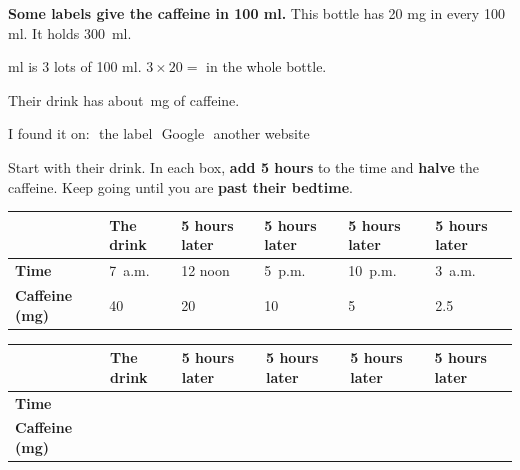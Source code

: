 \documentclass[12pt,a4paper]{article}
\newcommand{\tall}{\rule[-0.9em]{0pt}{2.6em}}
\newcommand{\hrow}{\rowcolor{cbteal!10}}
\newcommand{\starter}[1]{{\leavevmode\color{black!60}#1}}
\newcommand{\mg}[1][1.8cm]{\blank[#1]\,mg}
\newcommand{\choice}[1]{\tickbox\,\,#1}
\newcommand{\halvehead}{%
  \hline
  \hrow & \textbf{The drink} & \textbf{5 hours later} & \textbf{5 hours later} &
    \textbf{5 hours later} & \textbf{5 hours later} \\ \hline}
\begin{document}
\noindent\begin{minipage}{\linewidth}
\noindent\textbf{Some labels give the caffeine in 100 ml.} This bottle has
20 mg in every 100 ml. It holds 300~ml.

\vspace{3pt}
 ml is 3 lots of 100 ml. \qquad $3 \times 20 =$  in the
whole bottle.

\vspace{3pt}

\vspace{12pt}
\noindent Their drink has about \mg[2.2cm] of caffeine.

\vspace{10pt}
\noindent I found it on: \quad \choice{the label} \quad\;
\choice{Google} \quad\; \choice{another website}
\end{minipage}

\noindent\begin{minipage}{\linewidth}
\noindent Start with their drink. In each box, \textbf{add 5 hours} to the
time and \textbf{halve} the caffeine. Keep going until you are
\textbf{past their bedtime}.

\vspace{8pt}

\vspace{3pt}
{\renewcommand{\arraystretch}{1.25}%
\noindent\begin{tabular}{|p{2.45cm}|C{2.3cm}|C{2.3cm}|C{2.3cm}|C{2.3cm}|C{2.3cm}|}
  \halvehead
  \textbf{Time} & \starter{7~a.m.} & \starter{12 noon} & \starter{5~p.m.} &
    \starter{10~p.m.} & \starter{3~a.m.} \\ \hline
  \textbf{Caffeine (mg)} & \starter{40} & \starter{20} & \starter{10} &
    \starter{5} & \starter{2.5} \\ \hline
\end{tabular}}

\vspace{12pt}

\vspace{3pt}
\noindent\begin{tabular}{|p{2.45cm}|C{2.3cm}|C{2.3cm}|C{2.3cm}|C{2.3cm}|C{2.3cm}|}
  \halvehead
  \textbf{Time}\tall & & & & & \\ \hline
  \textbf{Caffeine (mg)}\tall & & & & & \\ \hline
\end{tabular}
\end{minipage}
\end{document}
